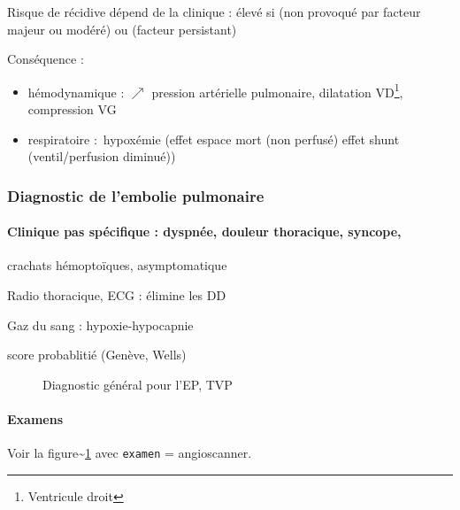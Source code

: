 \documentclass[11pt]{article}
\begin{document}
Risque de récidive dépend de la clinique : élevé si (non provoqué par facteur
majeur ou modéré) ou (\og facteur persistant)

Conséquence :

\begin{itemize}
\item hémodynamique : \(\nearrow\) pression artérielle pulmonaire, dilatation
VD\footnote{Ventricule droit}, compression VG
\item respiratoire : hypoxémie (effet espace mort (non perfusé) \thus effet shunt
(ventil/perfusion diminué))
\end{itemize}


\subsubsection{Diagnostic de l'embolie pulmonaire}
\label{sec:orgd3ef0b5}

\paragraph{Clinique pas spécifique : dyspnée, douleur thoracique, syncope,}
\label{sec:org1088d08}
crachats hémoptoïques, asymptomatique

Radio thoracique, ECG : élimine les DD

Gaz du sang : hypoxie-hypocapnie

\thus score probablitié (Genève, Wells)

\begin{figure}[htpb]
  \centering
  \caption{Diagnostic général pour l'EP, TVP}
  \label{fig:ep-diag}
\end{figure}


\paragraph{Examens}
\label{sec:org43f5608}
Voir la figure\textasciitilde{}\ref{fig:ep-diag} avec \texttt{examen} = angioscanner.
\end{document}
